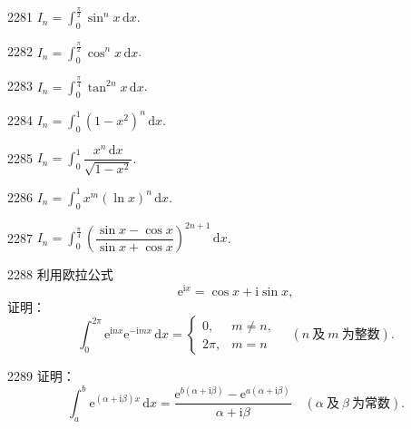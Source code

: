 
\begin{prob}[S]{2281}
$I_n = \int_0^{\frac{\pi}{2}} \sin^n x\,\mathrm{d}x$.
\end{prob}

\begin{prob}[S]{2282}
$I_n = \int_0^{\frac{\pi}{2}} \cos^n x\,\mathrm{d}x$.
\end{prob}

\begin{prob}[S]{2283}
$I_n = \int_0^{\frac{\pi}{4}} \tan^{2n} x\,\mathrm{d}x$.
\end{prob}

\begin{prob}[S]{2284}
$I_n = \int_0^1 (1-x^2)^n\,\mathrm{d}x$.
\end{prob}

\begin{prob}[S]{2285}
$I_n = \int_0^1 \dfrac{x^n\,\mathrm{d}x}{\sqrt{1-x^2}}$.
\end{prob}

\begin{prob}[S]{2286}
$I_n = \int_0^1 x^m (\ln x)^n\,\mathrm{d}x$.
\end{prob}

\begin{prob}[S]{2287}
$I_n = \int_0^{\frac{\pi}{4}} \left( \dfrac{\sin x - \cos x}{\sin x + \cos x} \right)^{2n+1}\,\mathrm{d}x$.
\end{prob}

\begin{prob}[M]{2288}
利用欧拉公式
\[ \mathrm{e}^{\mathrm{i}x} = \cos x + \mathrm{i}\sin x, \]
证明：
\[ \int_0^{2\pi} \mathrm{e}^{\mathrm{i}nx}\mathrm{e}^{-\mathrm{i}mx}\,\mathrm{d}x = \begin{cases} 0, & m \neq n, \\ 2\pi, & m = n \end{cases} \quad (n\ \text{及}\ m\ \text{为整数}). \]
\end{prob}

\begin{prob}[M]{2289}
证明：
\[ \int_a^b \mathrm{e}^{(\alpha+\mathrm{i}\beta)x}\,\mathrm{d}x = \frac{\mathrm{e}^{b(\alpha+\mathrm{i}\beta)} - \mathrm{e}^{a(\alpha+\mathrm{i}\beta)}}{\alpha+\mathrm{i}\beta} \quad (\alpha\ \text{及}\ \beta\ \text{为常数}). \]
\end{prob}


